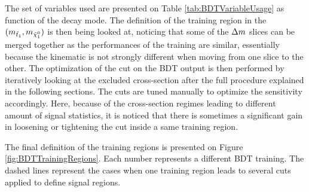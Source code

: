         The set of variables used are presented on Table \ref{tab:BDTVariableUsage} as function of the decay mode. The definition
        of the training region in the $(m_{\tilde{t}_1},m_{\tilde{\chi}_1^0})$ is then being looked at, noticing that some of the
        $\Delta m$ slices can be merged together as the performances of the training are similar, essentially because the kinematic
        is not strongly different when moving from one slice to the other. The optimization of the cut on the BDT output is then
        performed by iteratively looking at the excluded cross-section after the full procedure explained in the following sections.
        The cuts are tuned manually to optimize the sensitivity accordingly. Here, because of the cross-section regimes leading to
        different amount of signal statistics, it is noticed that there is sometimes a significant gain in loosening or tightening
        the cut inside a same training region.

        The final definition of the training regions is presented on Figure \ref{fig:BDTTrainingRegions}. Each number represents a
        different BDT training. The dashed lines represent the cases when one training region leads to several cuts applied to define
        signal regions.

